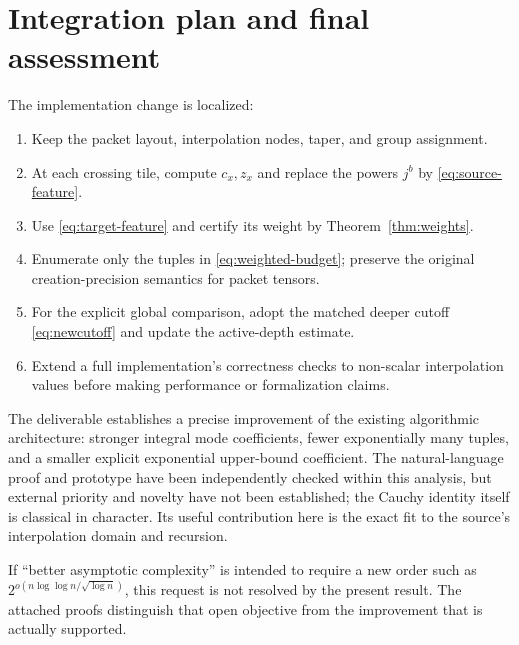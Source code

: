\documentclass[11pt]{article}
\theoremstyle{remark}
\begin{document}
\section{Integration plan and final assessment}

The implementation change is localized:
\begin{enumerate}[leftmargin=2em]
\item Keep the packet layout, interpolation nodes, taper, and group assignment.
\item At each crossing tile, compute $c_x,z_x$ and replace the powers $j^b$ by \eqref{eq:source-feature}.
\item Use \eqref{eq:target-feature} and certify its weight by Theorem~\ref{thm:weights}.
\item Enumerate only the tuples in \eqref{eq:weighted-budget}; preserve the original creation-precision semantics for packet tensors.
\item For the explicit global comparison, adopt the matched deeper cutoff \eqref{eq:newcutoff} and update the active-depth estimate.
\item Extend a full implementation's correctness checks to non-scalar interpolation values before making performance or formalization claims.
\end{enumerate}

The deliverable establishes a precise improvement of the existing algorithmic architecture: stronger integral mode coefficients, fewer exponentially many tuples, and a smaller explicit exponential upper-bound coefficient. The natural-language proof and prototype have been independently checked within this analysis, but external priority and novelty have not been established; the Cauchy identity itself is classical in character. Its useful contribution here is the exact fit to the source's interpolation domain and recursion.

If ``better asymptotic complexity'' is intended to require a new order such as $2^{o(n\log\log n/\sqrt{\log n})}$, this request is not resolved by the present result. The attached proofs distinguish that open objective from the improvement that is actually supported.
\end{document}

